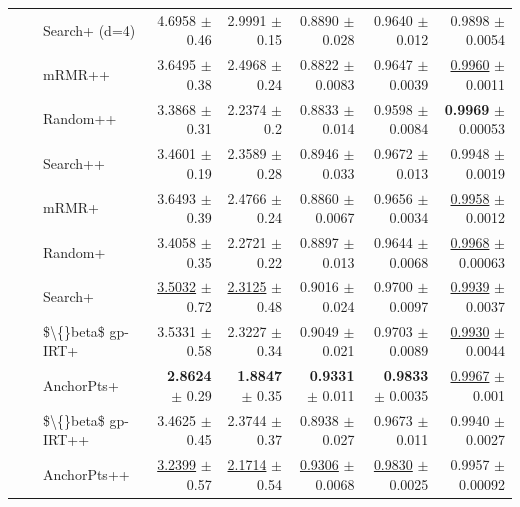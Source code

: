 \begin{longtable}{llp{}rrrrr}
 &  & Search+ (d=4) & 4.6958 {\scriptsize $\pm$ 0.46} & 2.9991 {\scriptsize $\pm$ 0.15} & 0.8890 {\scriptsize $\pm$ 0.028} & 0.9640 {\scriptsize $\pm$ 0.012} & 0.9898 {\scriptsize $\pm$ 0.0054} \\
 &  & mRMR++ & 3.6495 {\scriptsize $\pm$ 0.38} & 2.4968 {\scriptsize $\pm$ 0.24} & 0.8822 {\scriptsize $\pm$ 0.0083} & 0.9647 {\scriptsize $\pm$ 0.0039} & \underline{0.9960} {\scriptsize $\pm$ 0.0011} \\
 &  & Random++ & 3.3868 {\scriptsize $\pm$ 0.31} & 2.2374 {\scriptsize $\pm$ 0.2} & 0.8833 {\scriptsize $\pm$ 0.014} & 0.9598 {\scriptsize $\pm$ 0.0084} & \textbf{0.9969} {\scriptsize $\pm$ 0.00053} \\
 &  & Search++ & 3.4601 {\scriptsize $\pm$ 0.19} & 2.3589 {\scriptsize $\pm$ 0.28} & 0.8946 {\scriptsize $\pm$ 0.033} & 0.9672 {\scriptsize $\pm$ 0.013} & 0.9948 {\scriptsize $\pm$ 0.0019} \\
 &  & mRMR+ & 3.6493 {\scriptsize $\pm$ 0.39} & 2.4766 {\scriptsize $\pm$ 0.24} & 0.8860 {\scriptsize $\pm$ 0.0067} & 0.9656 {\scriptsize $\pm$ 0.0034} & \underline{0.9958} {\scriptsize $\pm$ 0.0012} \\
 &  & Random+ & 3.4058 {\scriptsize $\pm$ 0.35} & 2.2721 {\scriptsize $\pm$ 0.22} & 0.8897 {\scriptsize $\pm$ 0.013} & 0.9644 {\scriptsize $\pm$ 0.0068} & \underline{0.9968} {\scriptsize $\pm$ 0.00063} \\
 &  & Search+ & \underline{3.5032} {\scriptsize $\pm$ 0.72} & \underline{2.3125} {\scriptsize $\pm$ 0.48} & 0.9016 {\scriptsize $\pm$ 0.024} & 0.9700 {\scriptsize $\pm$ 0.0097} & \underline{0.9939} {\scriptsize $\pm$ 0.0037} \\
 &  & \$\textbackslash\{\}beta\$ gp-IRT+ & 3.5331 {\scriptsize $\pm$ 0.58} & 2.3227 {\scriptsize $\pm$ 0.34} & 0.9049 {\scriptsize $\pm$ 0.021} & 0.9703 {\scriptsize $\pm$ 0.0089} & \underline{0.9930} {\scriptsize $\pm$ 0.0044} \\
 &  & AnchorPts+ & \textbf{2.8624} {\scriptsize $\pm$ 0.29} & \textbf{1.8847} {\scriptsize $\pm$ 0.35} & \textbf{0.9331} {\scriptsize $\pm$ 0.011} & \textbf{0.9833} {\scriptsize $\pm$ 0.0035} & \underline{0.9967} {\scriptsize $\pm$ 0.001} \\
 &  & \$\textbackslash\{\}beta\$ gp-IRT++ & 3.4625 {\scriptsize $\pm$ 0.45} & 2.3744 {\scriptsize $\pm$ 0.37} & 0.8938 {\scriptsize $\pm$ 0.027} & 0.9673 {\scriptsize $\pm$ 0.011} & 0.9940 {\scriptsize $\pm$ 0.0027} \\
 &  & AnchorPts++ & \underline{3.2399} {\scriptsize $\pm$ 0.57} & \underline{2.1714} {\scriptsize $\pm$ 0.54} & \underline{0.9306} {\scriptsize $\pm$ 0.0068} & \underline{0.9830} {\scriptsize $\pm$ 0.0025} & 0.9957 {\scriptsize $\pm$ 0.00092} \\

\end{longtable}
